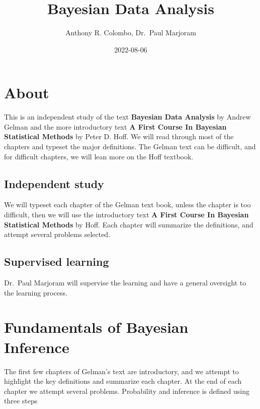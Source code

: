 \documentclass[
]{book}
\title{Bayesian Data Analysis}
\author{Anthony R. Colombo, Dr.~Paul Marjoram}
\date{2022-08-06}
\theoremstyle{definition}
\theoremstyle{definition}
\theoremstyle{definition}
\theoremstyle{definition}
\theoremstyle{remark}
\begin{document}
\maketitle

{
\setcounter{tocdepth}{1}
\tableofcontents
}
\hypertarget{about}{%
\chapter*{About}\label{about}}

This is an independent study of the text \textbf{Bayesian Data Analysis} by Andrew Gelman and the more introductory text \textbf{A First Course In Bayesian Statistical Methods} by Peter D. Hoff. We will read through most of the chapters and typeset the major definitions. The Gelman text can be difficult, and for difficult chapters, we will lean more on the Hoff textbook.

\hypertarget{independent-study}{%
\section*{Independent study}\label{independent-study}}

We will typeset each chapter of the Gelman text book, unless the chapter is too difficult, then we will use the introductory text \textbf{A First Course In Bayesian Statistical Methods} by Hoff. Each chapter will summarize the definitions, and attempt several problems selected.

\hypertarget{supervised-learning}{%
\section*{Supervised learning}\label{supervised-learning}}

Dr.~Paul Marjoram will supervise the learning and have a general oversight to the learning process.

\hypertarget{fundamentals-of-bayesian-inference}{%
\chapter{Fundamentals of Bayesian Inference}\label{fundamentals-of-bayesian-inference}}

The first few chapters of Gelman's text are introductory, and we attempt to highlight the key definitions and summarize each chapter. At the end of each chapter we attempt several problems. Probability and inference is defined using three steps
\end{document}
